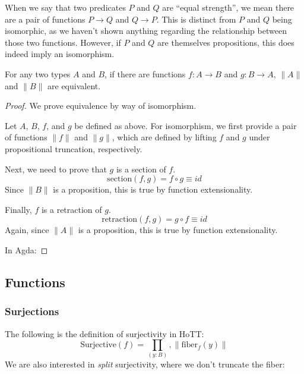\begin{refsection}
\begin{subappendices}
When we say that two predicates \(P\) and \(Q\) are ``equal strength'', we mean
there are a pair of functions \(P \rightarrow Q\) and \(Q \rightarrow P\).
This is distinct from \(P\) and \(Q\) being isomorphic, as we haven't shown
anything regarding the relationship between those two functions.
However, if \(P\) and \(Q\) are themselves propositions, this does indeed imply
an isomorphism.
\begin{lemma} \label{equal-strength}
  For any two types \(A\) and \(B\), if there are functions \(f : A \rightarrow
  B\) and \(g : B \rightarrow A\), \(\lVert A \rVert\) and \(\lVert B \rVert\)
  are equivalent.
\end{lemma}
\begin{proof}
  We prove equivalence by way of isomorphism.

  Let \(A\), \(B\), \(f\), and \(g\) be defined as above.
  For isomorphism, we first provide a pair of functions \(\lVert f \rVert\) and
  \(\lVert g \rVert\), which are defined by lifting \(f\) and \(g\) under
  propositional truncation, respectively.

  Next, we need to prove that \(g\) is a section of \(f\).
  \begin{equation}
    \text{section}(f, g) = f \circ g \equiv id
  \end{equation}
  Since \(\lVert B \rVert\) is a proposition, this is true by function
  extensionality.

  Finally, \(f\) is a retraction of \(g\).
  \begin{equation}
    \text{retraction}(f, g) = g \circ f \equiv id
  \end{equation}
  Again, since \(\lVert A \rVert\) is a proposition, this is true by function
  extensionality.
  
  In Agda:
\end{proof}
\subsection{Functions}
\subsubsection{Surjections}
The following is the definition of surjectivity in HoTT:
\begin{equation}
  \text{Surjective}(f) = \prod_{(y : B)} , \lVert \text{fiber}_f(y) \rVert
\end{equation}
We are also interested in \emph{split} surjectivity, where we don't truncate the
fiber:


\end{subappendices}
\end{refsection}
